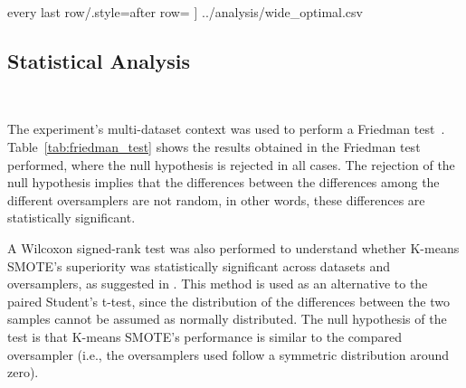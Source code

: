 \documentclass[information,article,submit,moreauthors,pdftex]{Definitions/mdpi}
\begin{document}
	every last row/.style={after row=\bottomrule}
]
{../analysis/wide_optimal.csv}
\begin{paracol}{2}
\linenumbers
\switchcolumn

\subsection{Statistical Analysis}~\label{sec:statistical_analysis}

The experiment's multi-dataset context was used to perform a Friedman
test~\citep{friedman1937use}. Table~\ref{tab:friedman_test} shows the results
obtained in the Friedman test performed, where the null hypothesis is rejected
in all cases. The rejection of the null hypothesis implies that the
differences between the differences among the different oversamplers are not
random, in other words, these differences are statistically significant.

\end{paracol}
\begin{table}[H]
    \caption{
        Results for Friedman test. Statistical significance is tested at a
        level of $\alpha = 0.05$. The null hypothesis is that there is no
        difference in the classification outcome across oversamplers.
    \vspace{-.6cm}}\label{tab:friedman_test}
\end{table}
\begin{paracol}{2}
\linenumbers
\switchcolumn

A Wilcoxon signed-rank test \citep{wilcoxon1992} was also performed to
understand whether K-means SMOTE's superiority was statistically significant
across datasets and oversamplers, as suggested in \citep{Demsar2006}. This
method is used as an alternative to the paired Student's t-test, since the
distribution of the differences between the two samples cannot be assumed as
normally distributed. The null hypothesis of the test is that K-means SMOTE's
performance is similar to the compared oversampler (i.e., the oversamplers
used follow a symmetric distribution around zero).

\end{paracol}
\end{document}
